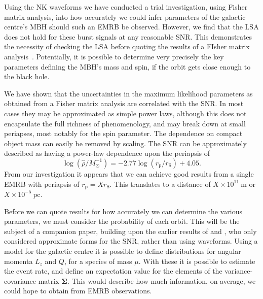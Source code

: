 \documentclass[useAMS,usedcolumn,usegraphicx,usenatbib]{mn2e}
\newcommand{\units}[1]{\ensuremath{~\mathrm{#1}}}
\newcommand{\sub}[1]{\ensuremath{_\mathrm{#1}}}
\begin{document}
Using the NK waveforms we have conducted a trial investigation, using Fisher matrix analysis, into how accurately we could infer parameters of the galactic centre's MBH should such an EMRB be observed. However, we find that the LSA does not hold for these burst signals at any reasonable SNR. This demonstrates the necessity of checking the LSA before quoting the results of a FIsher matrix analysis~\citep{Vallisneri2008}. Potentially, it is possible to determine very precisely the key parameters defining the MBH's mass and spin, if the orbit gets close enough to the black hole. 

We have shown that the uncertainties in the maximum likelihood parameters as obtained from a Fisher matrix analysis are correlated with the SNR. In most cases they may be approximated as simple power laws, although this does not encapsulate the full richness of phenomenology, and may break down at small periapses, most notably for the spin parameter. The dependence on compact object mass can easily be removed by scaling. The SNR can be approximately described as having a power-law dependence upon the periapsis of
\begin{equation}
\log\left(\hat{\rho}/M_\odot^{-1}\right) = -2.77\log(r\sub{p}/r\sub{S}) + 4.05.
\end{equation}
From our investigation it appears that we can achieve good results from a single EMRB with periapsis of $r\sub{p} = X r\sub{S}$. This translates to a distance of $X \times 10^{11}\units{m}$ or $X \times 10^{-5}\units{pc}$.

Before we can quote results for how accurately we can determine the various parameters, we must consider the probability of each orbit. This will be the subject of a companion paper, building upon the earlier results of \citet{Rubbo2006} and \citet{Hopman2007}, who only considered approximate forms for the SNR, rather than using waveforms. Using a model for the galactic centre it is possible to define distributions for angular momenta $L_z$ and $Q$, for a species of mass $\mu$. With these it is possible to estimate the event rate, and define an expectation value for the elements of the variance-covariance matrix $\boldsymbol{\Sigma}$. This would describe how much information, on average, we could hope to obtain from EMRB observations.
\end{document}
